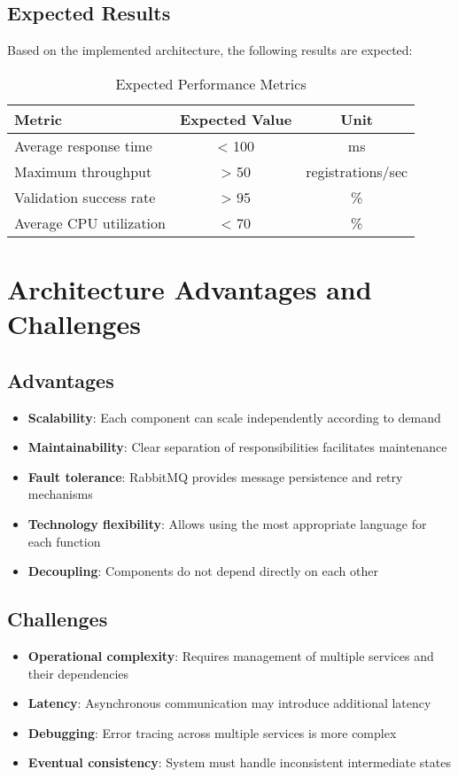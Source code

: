\documentclass[10pt,a4paper]{article}
\theoremstyle{definition}
\theoremstyle{remark}
\begin{document}
\subsection{Expected Results}
Based on the implemented architecture, the following results are expected:

\begin{table}[H]
\centering
\caption{Expected Performance Metrics}
\begin{tabular}{|l|c|c|}
\hline
\textbf{Metric} & \textbf{Expected Value} & \textbf{Unit} \\ \hline
Average response time & < 100 & ms \\ \hline
Maximum throughput & > 50 & registrations/sec \\ \hline
Validation success rate & > 95 & \% \\ \hline
Average CPU utilization & < 70 & \% \\ \hline
\end{tabular}
\end{table}

\section{Architecture Advantages and Challenges}

\subsection{Advantages}
\begin{itemize}
    \item \textbf{Scalability}: Each component can scale independently according to demand
    \item \textbf{Maintainability}: Clear separation of responsibilities facilitates maintenance
    \item \textbf{Fault tolerance}: RabbitMQ provides message persistence and retry mechanisms
    \item \textbf{Technology flexibility}: Allows using the most appropriate language for each function
    \item \textbf{Decoupling}: Components do not depend directly on each other
\end{itemize}

\subsection{Challenges}
\begin{itemize}
    \item \textbf{Operational complexity}: Requires management of multiple services and their dependencies
    \item \textbf{Latency}: Asynchronous communication may introduce additional latency
    \item \textbf{Debugging}: Error tracing across multiple services is more complex
    \item \textbf{Eventual consistency}: System must handle inconsistent intermediate states
\end{itemize}
\end{document}
